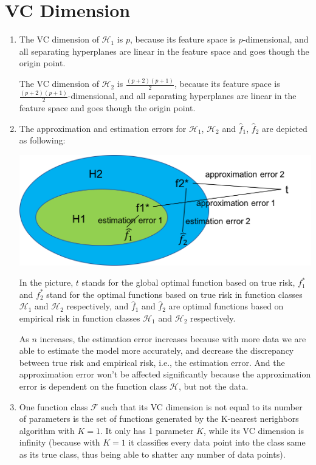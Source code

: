 \documentclass[paper=letter, fontsize=12pt]{article}
\begin{document}
\section{VC Dimension}

\begin{enumerate}[label=(\alph*)]
	\item 
	The VC dimension of $\mathcal{H}_1$ is $p$, because its feature space is $p$-dimensional, and all separating hyperplanes are linear in the feature space and goes though the origin point.
	
	The VC dimension of $\mathcal{H}_2$ is $\frac{(p+2)(p+1)}{2}$, because its feature space is $\frac{(p+2)(p+1)}{2}$-dimensional, and all separating hyperplanes are linear in the feature space and goes though the origin point.
	
	\item The approximation and estimation errors for $\mathcal{H}_1$, $\mathcal{H}_2$ and $\hat{f}_1$, $\hat{f}_2$ are depicted as following:
	
	\includegraphics[scale=0.6]{q2b.png}
	
	In the picture, $t$ stands for the global optimal function based on true risk, $f_1^*$ and $f_2^*$ stand for the optimal functions based on true risk in function classes $\mathcal{H}_1$ and $\mathcal{H}_2$ respectively, and $\hat{f}_1$ and $\hat{f}_2$ are optimal functions based on empirical risk in function classes $\mathcal{H}_1$ and $\mathcal{H}_2$ respectively.
	
	As $n$ increases, the estimation error increases because with more data we are able to estimate the model more accurately, and decrease the discrepancy between true risk and empirical risk, i.e., the estimation error. And the approximation error won't be affected significantly because the approximation error is dependent on the function class $\mathcal{H}$, but not the data.
	
	\item One function class $\mathcal{F}$ such that its VC dimension is not equal to its number of parameters is the set of functions generated by the K-nearest nerighbors algorithm with $K=1$. It only has 1 parameter $K$, while its VC dimension is infinity (because with $K=1$ it classifies every data point into the class same as its true class, thus being able to shatter any number of data points).
\end{enumerate}
\end{document}
